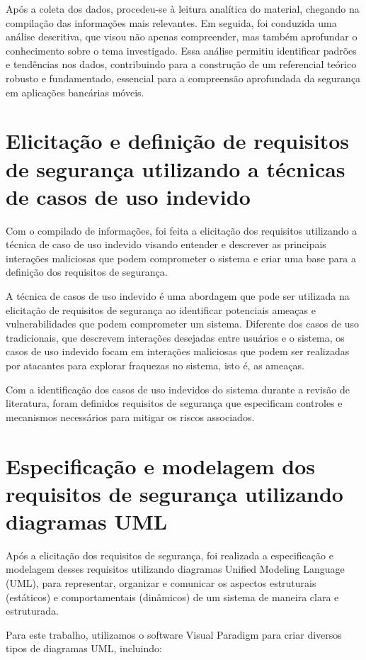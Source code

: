     Após a coleta dos dados, procedeu-se à leitura analítica do material, chegando na compilação das informações mais relevantes. Em seguida, foi conduzida uma análise descritiva, que visou não apenas compreender, mas também aprofundar o conhecimento sobre o tema investigado. Essa análise permitiu identificar padrões e tendências nos dados, contribuindo para a construção de um referencial teórico robusto e fundamentado, essencial para a compreensão aprofundada da segurança em aplicações bancárias móveis.

    \section{Elicitação e definição de requisitos de segurança utilizando a técnicas de casos de uso indevido}
    Com o compilado de informações, foi feita a elicitação dos requisitos utilizando a técnica de caso de uso indevido visando entender e descrever as principais interações maliciosas que podem comprometer o sistema e criar uma base para a definição dos requisitos de segurança.
    
    A técnica de casos de uso indevido é uma abordagem que pode ser utilizada na elicitação de requisitos de segurança ao identificar potenciais ameaças e vulnerabilidades que podem comprometer um sistema. Diferente dos casos de uso tradicionais, que descrevem interações desejadas entre usuários e o sistema, os casos de uso indevido focam em interações maliciosas que podem ser realizadas por atacantes para explorar fraquezas no sistema, isto é, as ameaças.

    Com a identificação dos casos de uso indevidos do sistema durante a revisão de literatura, foram definidos requisitos de segurança que especificam controles e mecanismos necessários para mitigar os riscos associados.

    \section{Especificação e modelagem dos requisitos de segurança utilizando diagramas UML}
    Após a elicitação dos requisitos de segurança, foi realizada a especificação e modelagem desses requisitos utilizando diagramas Unified Modeling Language (UML), para representar, organizar e comunicar os aspectos estruturais (estáticos) e comportamentais (dinâmicos) de um sistema de maneira clara e estruturada.

    Para este trabalho, utilizamos o software Visual Paradigm para criar diversos tipos de diagramas UML, incluindo:

